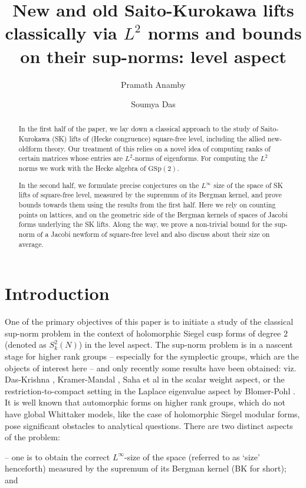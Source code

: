 \documentclass[11pt]{amsart}
\author{Pramath Anamby }
\author{Soumya Das}
\date{}
\numberwithin{equation}{section}
\theoremstyle{plain}
\theoremstyle{definition}
\newcommand{\mrm}{\mathrm}
\begin{document}
\title[Classical SK lifts and their sizes]{New and old Saito-Kurokawa lifts classically via $L^2$ norms and bounds on their sup-norms: level aspect}

\begin{abstract}
In the first half of the paper, we lay down a classical approach to the study of Saito-Kurokawa (SK) lifts of (Hecke congruence) square-free level, including the allied new-oldform theory. Our treatment of this relies on a novel idea of computing ranks of certain matrices whose entries are $L^2$-norms of eigenforms. For computing the $L^2$ norms we work with the Hecke algebra of $\mrm{GSp}(2)$.

In the second half, we formulate precise conjectures on the $L^\infty$ size of the space of SK lifts of square-free level, measured by the supremum of its Bergman kernel, and prove bounds towards them using the results from the first half. Here we rely on counting points on lattices, and on the geometric side of the Bergman kernels of spaces of Jacobi forms underlying the SK lifts. Along the way, we prove a non-trivial bound for the sup-norm of a Jacobi newform of square-free level and also discuss about their size on average.
\end{abstract}
%
\maketitle
%
\section{Introduction}
One of the primary objectives of this paper is to initiate 
a study of the classical sup-norm problem in the context of holomorphic Siegel cusp forms of degree $2$ (denoted as $S_k^2(N)$) in the level aspect.
 The sup-norm problem is in a nascent stage for higher rank groups -- especially for the symplectic groups, which are the objects of interest here -- and only recently some results have been obtained: viz. Das-Krishna \cite{sd-hk}, Kramer-Mandal \cite{kr-sup}, Saha et al \cite{saha-deg2} in the scalar weight aspect, or the restriction-to-compact setting in the Laplace eigenvalue aspect by Blomer-Pohl \cite{blo-pohl}. It is well known that automorphic forms on higher rank groups, which do not have global Whittaker models, like the case of holomorphic Siegel modular forms, pose significant obstacles to analytical questions. There are two distinct aspects of the problem: 
 
-- one is to obtain the correct $L^\infty$-size of the space (referred to as `size' henceforth) measured by the supremum of its Bergman kernel (BK for short); and 
 
\end{document}

